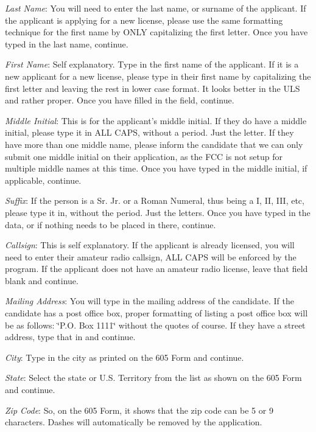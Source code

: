 \begin{DoxyItemize}
\item {\itshape Last Name}\+: You will need to enter the last name, or surname of the applicant. If the applicant is applying for a new license, please use the same formatting technique for the first name by O\+N\+LY capitalizing the first letter. Once you have typed in the last name, continue.
\item {\itshape First Name}\+: Self explanatory. Type in the first name of the applicant. If it is a new applicant for a new license, please type in their first name by capitalizing the first letter and leaving the rest in lower case format. It looks better in the U\+LS and rather proper. Once you have filled in the field, continue.
\item {\itshape Middle Initial}\+: This is for the applicant’s middle initial. If they do have a middle initial, please type it in A\+LL C\+A\+PS, without a period. Just the letter. If they have more than one middle name, please inform the candidate that we can only submit one middle initial on their application, as the F\+CC is not setup for multiple middle names at this time. Once you have typed in the middle initial, if applicable, continue.
\item {\itshape Suffix}\+: If the person is a Sr. Jr. or a Roman Numeral, thus being a I, II, I\+II, etc, please type it in, without the period. Just the letters. Once you have typed in the data, or if nothing needs to be placed in there, continue.
\item {\itshape Callsign}\+: This is self explanatory. If the applicant is already licensed, you will need to enter their amateur radio callsign, A\+LL C\+A\+PS will be enforced by the program. If the applicant does not have an amateur radio license, leave that field blank and continue.
\item {\itshape Mailing Address}\+: You will type in the mailing address of the candidate. If the candidate has a post office box, proper formatting of listing a post office box will be as follows\+: \char`\"{}\+P.\+O. Box 1111\char`\"{} without the quotes of course. If they have a street address, type that in and continue.
\item {\itshape City}\+: Type in the city as printed on the 605 Form and continue.
\item {\itshape State}\+: Select the state or U.\+S. Territory from the list as shown on the 605 Form and continue.
\item {\itshape Zip Code}\+: So, on the 605 Form, it shows that the zip code can be 5 or 9 characters. Dashes will automatically be removed by the application.

\end{DoxyItemize}
